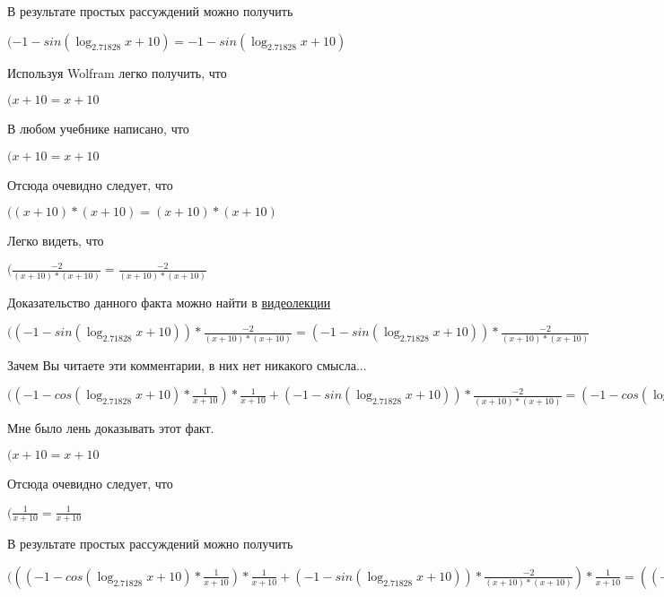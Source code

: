 \documentclass[12pt,a4paper,fleqn]{article}
\theoremstyle{definition}
\begin{document}
В результате простых рассуждений можно получить

$( -1  - sin(\log_{ 2.71828 }{ x  +  10 }) =  -1  - sin(\log_{ 2.71828 }{ x  +  10 })$

Используя Wolfram легко получить, что

$( x  +  10  =  x  +  10 $

В любом учебнике написано, что

$( x  +  10  =  x  +  10 $

Отсюда очевидно следует, что

$(( x  +  10 ) * ( x  +  10 ) = ( x  +  10 ) * ( x  +  10 )$

Легко видеть, что

$(\frac{ -2 }{( x  +  10 ) * ( x  +  10 )}
 = \frac{ -2 }{( x  +  10 ) * ( x  +  10 )}
$

Доказательство данного факта можно найти в \href{https://www.youtube.com/watch?v=dQw4w9WgXcQ}{видеолекции}

$(( -1  - sin(\log_{ 2.71828 }{ x  +  10 })) * \frac{ -2 }{( x  +  10 ) * ( x  +  10 )}
 = ( -1  - sin(\log_{ 2.71828 }{ x  +  10 })) * \frac{ -2 }{( x  +  10 ) * ( x  +  10 )}
$

Зачем Вы читаете эти комментарии, в них нет никакого смысла...

$(( -1  - cos(\log_{ 2.71828 }{ x  +  10 }) * \frac{ 1 }{ x  +  10 }
) * \frac{ 1 }{ x  +  10 }
 + ( -1  - sin(\log_{ 2.71828 }{ x  +  10 })) * \frac{ -2 }{( x  +  10 ) * ( x  +  10 )}
 = ( -1  - cos(\log_{ 2.71828 }{ x  +  10 }) * \frac{ 1 }{ x  +  10 }
) * \frac{ 1 }{ x  +  10 }
 + ( -1  - sin(\log_{ 2.71828 }{ x  +  10 })) * \frac{ -2 }{( x  +  10 ) * ( x  +  10 )}
$

Мне было лень доказывать этот факт.

$( x  +  10  =  x  +  10 $

Отсюда очевидно следует, что

$(\frac{ 1 }{ x  +  10 }
 = \frac{ 1 }{ x  +  10 }
$

В результате простых рассуждений можно получить

$((( -1  - cos(\log_{ 2.71828 }{ x  +  10 }) * \frac{ 1 }{ x  +  10 }
) * \frac{ 1 }{ x  +  10 }
 + ( -1  - sin(\log_{ 2.71828 }{ x  +  10 })) * \frac{ -2 }{( x  +  10 ) * ( x  +  10 )}
) * \frac{ 1 }{ x  +  10 }
 = (( -1  - cos(\log_{ 2.71828 }{ x  +  10 }) * \frac{ 1 }{ x  +  10 }
) * \frac{ 1 }{ x  +  10 }
 + ( -1  - sin(\log_{ 2.71828 }{ x  +  10 })) * \frac{ -2 }{( x  +  10 ) * ( x  +  10 )}
) * \frac{ 1 }{ x  +  10 }
$
\end{document}

